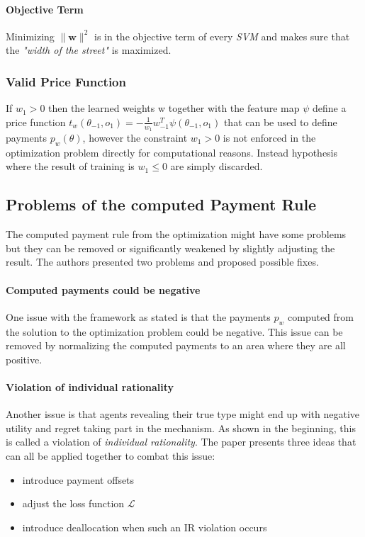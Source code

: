\documentclass[]{article}
\begin{document}
\paragraph{Objective Term} Minimizing $\lVert \mathbf{w} \rVert^{2}$ is in the objective term of every \emph{SVM} and makes sure that the \textit{"width of the street"} is maximized.

\subsubsection{Valid Price Function}
\noindent If $w_{1} > 0$ then the learned weights w together with the feature map $\psi$ define a price function 	$t_{w}(\theta_{-1}, o_{1}) = - \frac{1}{w_{1}} w_{-1}^T \psi(\theta_{-1},o_{1})$ that can be used to define payments $p_{w}(\theta)$, however the constraint $w_{1} > 0$ is not enforced in the optimization problem directly for computational reasons. Instead hypothesis where the result of training is $w_{1} \leq 0$ are simply discarded.


\subsection{Problems of the computed Payment Rule}
The computed payment rule from the optimization might have some problems but they can be removed or significantly weakened by slightly adjusting the result. The authors presented two problems and proposed possible fixes.

\paragraph{Computed payments could be negative}  One issue with the framework as stated is that the payments $p_{w}$ computed from the solution to the optimization problem could be negative. This issue can be removed by normalizing the computed payments to an area where they are all positive.


\paragraph{Violation of individual rationality} Another issue is that agents revealing their true type might end up with negative utility and regret taking part in the mechanism. As shown in the beginning, this is called a violation of \emph{individual rationality}. The paper presents three ideas that can all be applied together to combat this issue: %
\begin{itemize}
	\item introduce payment offsets
	\item adjust the loss function $\mathcal{L}$
	\item introduce deallocation when such an IR violation occurs
\end{itemize}
\end{document}
